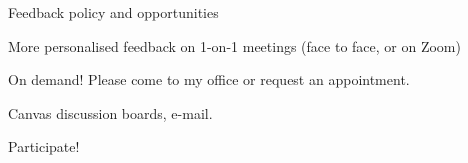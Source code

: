 \begin{frame}{Feedback policy and opportunities}
\begin{itemize}
{  \item More personalised feedback on 1-on-1 meetings (face to face, or on Zoom)
  \begin{itemize}
  {\scriptsize
    \item {\color{red}On demand! Please come to my office or request an appointment.}
  }
  \end{itemize}

  \item Canvas discussion boards, e-mail.
  \begin{itemize}
  {\scriptsize
    \item {\color{red}Participate!}
  }
  \end{itemize}

}
\end{itemize}

\end{frame}

%
%
%

